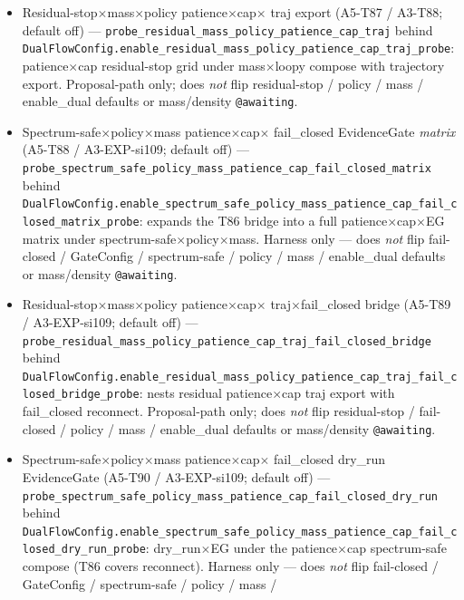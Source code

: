 \documentclass[11pt]{article}
\begin{document}
\begin{itemize}[leftmargin=1.5em]
  Harness only --- does \emph{not} flip fail-closed / GateConfig /
  spectrum-safe / policy / mass / enable\_dual defaults or mass/density
  \texttt{@awaiting}.
  \item Residual-stop$\times$mass$\times$policy patience$\times$cap$\times$
  traj export (A5-T87 / A3-T88; default off) ---
  \texttt{probe\_residual\_mass\_policy\_patience\_cap\_traj} behind
  \texttt{DualFlowConfig.enable\_residual\_mass\_policy\_patience\_cap\_traj\_probe}:
  patience$\times$cap residual-stop grid under mass$\times$loopy compose
  with trajectory export. Proposal-path only; does \emph{not} flip
  residual-stop / policy / mass / enable\_dual defaults or mass/density
  \texttt{@awaiting}.
  \item Spectrum-safe$\times$policy$\times$mass patience$\times$cap$\times$
  fail\_closed EvidenceGate \emph{matrix} (A5-T88 / A3-EXP-si109;
  default off) ---
  \texttt{probe\_spectrum\_safe\_policy\_mass\_patience\_cap\_fail\_closed\_matrix}
  behind
  \texttt{DualFlowConfig.enable\_spectrum\_safe\_policy\_mass\_patience\_cap\_fail\_closed\_matrix\_probe}:
  expands the T86 bridge into a full patience$\times$cap$\times$EG matrix
  under spectrum-safe$\times$policy$\times$mass. Harness only --- does
  \emph{not} flip fail-closed / GateConfig / spectrum-safe / policy /
  mass / enable\_dual defaults or mass/density \texttt{@awaiting}.
  \item Residual-stop$\times$mass$\times$policy patience$\times$cap$\times$
  traj$\times$fail\_closed bridge (A5-T89 / A3-EXP-si109; default off) ---
  \texttt{probe\_residual\_mass\_policy\_patience\_cap\_traj\_fail\_closed\_bridge}
  behind
  \texttt{DualFlowConfig.enable\_residual\_mass\_policy\_patience\_cap\_traj\_fail\_closed\_bridge\_probe}:
  nests residual patience$\times$cap traj export with fail\_closed
  reconnect. Proposal-path only; does \emph{not} flip residual-stop /
  fail-closed / policy / mass / enable\_dual defaults or mass/density
  \texttt{@awaiting}.
  \item Spectrum-safe$\times$policy$\times$mass patience$\times$cap$\times$
  fail\_closed dry\_run EvidenceGate (A5-T90 / A3-EXP-si109; default off)
  ---
  \texttt{probe\_spectrum\_safe\_policy\_mass\_patience\_cap\_fail\_closed\_dry\_run}
  behind
  \texttt{DualFlowConfig.enable\_spectrum\_safe\_policy\_mass\_patience\_cap\_fail\_closed\_dry\_run\_probe}:
  dry\_run$\times$EG under the patience$\times$cap spectrum-safe compose
  (T86 covers reconnect). Harness only --- does \emph{not} flip
  fail-closed / GateConfig / spectrum-safe / policy / mass /

\end{itemize}
\end{document}
